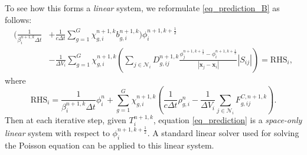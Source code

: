 \documentclass[preprint,12pt]{elsarticle}
\theoremstyle{definition}
\theoremstyle{plain}
\numberwithin{equation}{section}
\numberwithin{algorithm}{section}
\newcounter{eq_count}
\newcommand{\half}{\frac{1}{2}}
\newcommand{\vr}{\mathbf{x}}
\begin{document}
    	To see how this forms a \textit{linear} system, we reformulate \eqref{eq_prediction_B} as follows:
    	\begin{equation}\label{eq_prediction}
    		\begin{aligned}
    			\Big(\frac{1}{\beta_i^{n+1,k} \Delta t} 
    			&+ \frac{1}{c \Delta t} \sum_{g=1}^G \chi_{g,i}^{n+1, k} b_{g,i}^{n+1, k}    \Big)\phi_i^{n+1,k+\frac{1}{2}}
    			\\
    			&-   \frac{1}{\Delta V_i} \sum_{g=1}^G \chi_{g,i}^{n+1, k} \left(  \sum_{j \in \mathcal{N}_i}   D_{g,ij}^{n+1,k}\frac{\phi_{j}^{n+1,k+\half} - \phi_i^{n+1,k+\half}}{ |\vr_j - \vr_i| }|S_{ij}|    \right)= \text{RHS}_i,
    		\end{aligned}
    	\end{equation}
    	where 
    	\begin{equation*}
    		\text{RHS}_i = \frac{1}{\beta_i^{n+1,k} \Delta t}\phi_i^n +  
    		\sum_{g=1}^G \chi_{g,i}^{n+1, k}  \left(\frac{1}{c \Delta t}\rho_{g,i}^n- \frac{1}{\Delta V_i} \sum_{j \in \mathcal{N}_i} F_{g,ij}^{C,n+1,k} \right).
    	\end{equation*}
    	Then at each iterative step, given $T_i^{n+1,k}$, equation \eqref{eq_prediction}  is a \textit{space-only linear} system with respect to $\phi_i^{n+1,k+\frac{1}{2}}$. A standard linear solver used for solving the Poisson equation can be applied to this linear system.
    	
\end{document}
